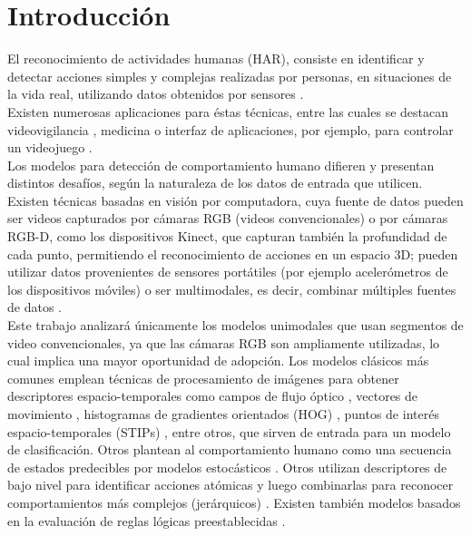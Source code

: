 \chapter{Introducción} \label{intro}

El reconocimiento de actividades humanas (HAR), consiste en identificar y detectar acciones simples y complejas realizadas por personas, en situaciones de la vida real, utilizando datos obtenidos por sensores \citep{Singh2017}.\\

Existen numerosas aplicaciones para éstas técnicas, entre las cuales se destacan videovigilancia \citep{Ryoo2011}, medicina  \citep{Gonzalez-Ortega2014} o interfaz de aplicaciones, por ejemplo, para controlar un videojuego \citep{Gerling2012}.\\

Los modelos para detección de comportamiento humano difieren y presentan distintos desafíos, según la naturaleza de los datos de entrada que utilicen. Existen técnicas basadas en visión por computadora, cuya fuente de datos pueden ser videos capturados por cámaras RGB (videos convencionales) o por cámaras RGB-D, como los dispositivos Kinect, que capturan también la profundidad de cada punto, permitiendo el reconocimiento de acciones en un espacio 3D; pueden utilizar datos provenientes de sensores portátiles (por ejemplo acelerómetros de los dispositivos móviles) o ser multimodales, es decir, combinar múltiples fuentes de datos \citep{Yadav2021}. \\

Este trabajo analizará únicamente los modelos unimodales que usan segmentos de video convencionales, ya que las cámaras RGB son ampliamente utilizadas, lo cual implica una mayor oportunidad de adopción. Los modelos clásicos más comunes emplean técnicas de procesamiento de imágenes para obtener descriptores espacio-temporales como campos de flujo óptico \citep{Efros2003, Chaudhry2009}, vectores de movimiento \citep{Zhang2018}, histogramas de gradientes orientados (HOG) \citep{Dalal2005}, puntos de interés espacio-temporales (STIPs) \citep{Yan2012}, entre otros, que sirven de entrada para un modelo de clasificación. Otros plantean al comportamiento humano como una secuencia de estados predecibles por modelos estocásticos \citep{Robertson2006}. Otros utilizan descriptores de bajo nivel para identificar acciones atómicas y luego combinarlas para reconocer comportamientos más complejos (jerárquicos) \citep{Song2013}. Existen también modelos basados en la evaluación de reglas lógicas preestablecidas \citep{Morariu2011}. \\

